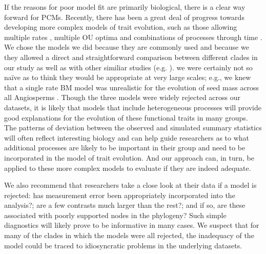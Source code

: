 \documentclass[a4paper,12pt]{article}
\begin{document}
If the reasons for poor model fit are primarily biological, there is a clear way forward for PCMs. Recently, there has been a great deal of progress towards developing more complex models of trait evolution, such as those allowing multiple rates \citep{Omeara2006, Eastman2011}, multiple OU optima \citep{ButlerKing2004, Beaulieu2012, UyedaBayou} and combinations of processes through time \citep{SlaterMEE}. We chose the models we did because they are commonly used and because we they allowed a direct and straightforward comparison between different clades in our study as well as with other similiar studies (e.g. \citep{Harmon2010}). we were certainly not so na\"{i}ve as to think they would be appropriate at very large scales; e.g., we knew that a single rate BM model was unrealistic for the evolution of seed mass across all Angiosperms \citep{Moles2005}. Though the three  models were widely rejected across our datasets, it is likely that models that include heterogeneous processes will provide good explanations for the evolution of these functional traits in many groups.  The patterns of deviation between the observed and simulated summary statistics will often reflect interesting biology and can help guide researchers as to what additional processes are likely to be important in their group and need to be incorporated in the model of trait evolution. And our approach can, in turn, be applied to these more complex models to evaluate if they are indeed adequate. 

We also recommend that researchers take a close look at their data if a model is rejected: has measurement error been appropriately incorporated into the analysis?; are a few contrasts much larger than the rest?; and if so, are these associated with poorly supported nodes in the phylogeny? Such simple diagnostics will likely prove to be informative in many cases. We suspect that for many of the clades in which the models were all rejected, the inadequacy of the model could be traced to idiosyncratic problems in the underlying datasets.
\end{document}
